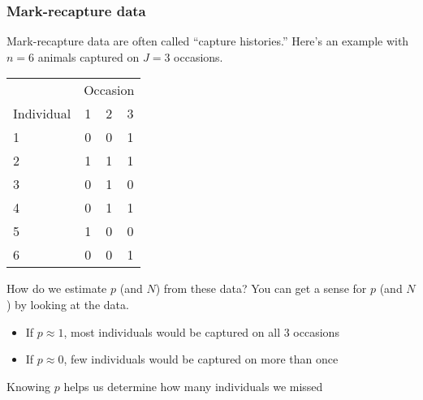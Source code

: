 \documentclass[color=usenames,dvipsnames]{beamer}\usepackage[]{graphicx}\usepackage[]{color}
\begin{document}
\begin{frame}
  \frametitle{Mark-recapture data}
  \small
  Mark-recapture data are often called ``capture histories.'' Here's
  an example with $n=6$ animals captured on $J=3$ occasions. \\
  \centering
  \begin{tabular}{lccc}
    \hline
    & \multicolumn{3}{c}{Occasion} \\
    \cline{2-4}
    Individual & 1 & 2 & 3 \\
    \hline
    1 & 0 & 0 & 1 \\
    2 & 1 & 1 & 1 \\
    3 & 0 & 1 & 0 \\
    4 & 0 & 1 & 1 \\
    5 & 1 & 0 & 0 \\
    6 & 0 & 0 & 1 \\
    \hline
  \end{tabular}
  \pause
  \vfill
  \flushleft
  How do we estimate $p$ (and $N$) from these data? %
  \pause
  You can get a sense for $p$ (and $N$) by looking at the data.
  \begin{itemize}
    \setlength\itemsep{.1pt}
    \item If $p\approx 1$, most individuals would be captured
      on all 3 occasions
    \item If $p\approx 0$, few individuals would be captured on
      more than once
  \end{itemize}
  \pause
  \vfill
  Knowing $p$ helps us determine how many individuals we missed  
\end{frame}




\end{document}
